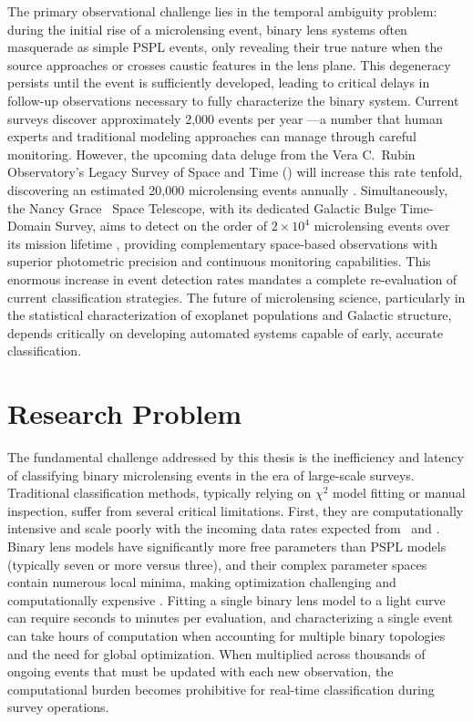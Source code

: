 The primary observational challenge lies in the temporal ambiguity problem: during the initial rise of a microlensing event, binary lens systems often masquerade as simple PSPL events, only revealing their true nature when the source approaches or crosses caustic features in the lens plane. This degeneracy persists until the event is sufficiently developed, leading to critical delays in follow-up observations necessary to fully characterize the binary system. Current surveys discover approximately 2,000 events per year \citep{Mroz2020}---a number that human experts and traditional modeling approaches can manage through careful monitoring. However, the upcoming data deluge from the Vera C.~Rubin Observatory's Legacy Survey of Space and Time (\lsst) will increase this rate tenfold, discovering an estimated 20,000 microlensing events annually \citep{LSSTScienceBook,Abrams2023}. Simultaneously, the Nancy Grace \romantel\ Space Telescope, with its dedicated Galactic Bulge Time-Domain Survey, aims to detect on the order of $2 \times 10^4$ microlensing events over its mission lifetime \citep{Penny2019,Street2018}, providing complementary space-based observations with superior photometric precision and continuous monitoring capabilities. This enormous increase in event detection rates mandates a complete re-evaluation of current classification strategies. The future of microlensing science, particularly in the statistical characterization of exoplanet populations and Galactic structure, depends critically on developing automated systems capable of early, accurate classification.

\section{Research Problem}
\label{sec:problem}

The fundamental challenge addressed by this thesis is the inefficiency and latency of classifying binary microlensing events in the era of large-scale surveys. Traditional classification methods, typically relying on $\chi^2$ model fitting or manual inspection, suffer from several critical limitations. First, they are computationally intensive and scale poorly with the incoming data rates expected from \lsst\ and \romantel. Binary lens models have significantly more free parameters than PSPL models (typically seven or more versus three), and their complex parameter spaces contain numerous local minima, making optimization challenging and computationally expensive \citep{Dong2006}. Fitting a single binary lens model to a light curve can require seconds to minutes per evaluation, and characterizing a single event can take hours of computation when accounting for multiple binary topologies and the need for global optimization. When multiplied across thousands of ongoing events that must be updated with each new observation, the computational burden becomes prohibitive for real-time classification during survey operations.

